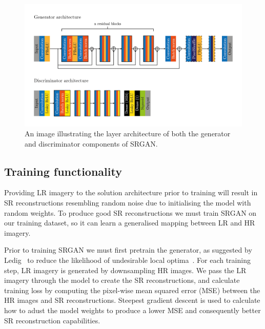 \begin{figure}
    \includegraphics[width=\linewidth]{./assets/srgan_architecture.png}
    \caption{An image illustrating the layer architecture of both the generator and discriminator components of SRGAN.}
    \label{fig:srgan_architecture}
\end{figure}

\subsection{Training functionality}\label{subsec:training_functionality}
Providing LR imagery to the solution architecture prior to training will result in SR reconstructions resembling random noise due to initialising the model with random weights. To produce good SR reconstructions we must train SRGAN on our training dataset, so it can learn a generalised mapping between LR and HR imagery.

Prior to training SRGAN we must first pretrain the generator, as suggested by Ledig \etal \ to reduce the likelihood of undesirable local optima~\cite{srgan}. For each training step, LR imagery is generated by downsampling HR images. We pass the LR imagery through the model to create the SR reconstructions, and calculate training loss by computing the pixel-wise mean squared error (MSE) between the HR images and SR reconstructions. Steepest gradient descent is used to calculate how to adust the model weights to produce a lower MSE and consequently better SR reconstruction capabilities.

